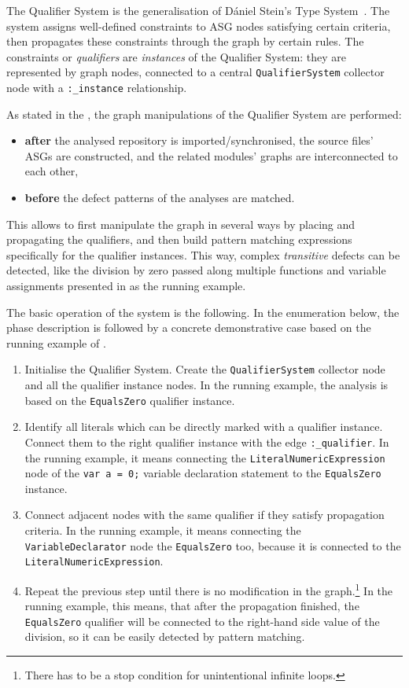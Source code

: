 The Qualifier System is the generalisation of Dániel Stein's Type System~\cite{stein-daniel-msc}. The system assigns well-defined constraints to ASG nodes satisfying certain criteria, then propagates these constraints through the graph by certain rules. The constraints or \emph{qualifiers} are \emph{instances} of the Qualifier System: they are represented by graph nodes, connected to a central \lstinline{QualifierSystem} collector node with a \lstinline{:_instance} relationship.

As stated in the , the graph manipulations of the Qualifier System are performed:
\begin{itemize}
\item \textbf{after} the analysed repository is imported/synchronised, the source files' ASGs are constructed, and the related modules' graphs are interconnected to each other,
\item \textbf{before} the defect patterns of the analyses are matched.
\end{itemize}

This allows to first manipulate the graph in several ways by placing and propagating the qualifiers, and then build pattern matching expressions specifically for the qualifier instances. This way, complex \emph{transitive} defects can be detected, like the division by zero passed along multiple functions and variable assignments presented in  as the running example.

The basic operation of the system is the following. In the enumeration below, the phase description is followed by a concrete demonstrative case based on the running example of .

\begin{enumerate}
\item Initialise the Qualifier System. Create the \lstinline{QualifierSystem} collector node and all the qualifier instance nodes. In the running example, the analysis is based on the \lstinline{EqualsZero} qualifier instance.
\item Identify all literals which can be directly marked with a qualifier instance. Connect them to the right qualifier instance with the edge \lstinline{:_qualifier}. In the running example, it means connecting the \lstinline{LiteralNumericExpression} node of the \lstinline{var a = 0;} variable declaration statement to the \lstinline{EqualsZero} instance.
\item Connect adjacent nodes with the same qualifier if they satisfy propagation criteria. In the running example, it means connecting the \lstinline{VariableDeclarator} node the \lstinline{EqualsZero} too, because it is connected to the \lstinline{LiteralNumericExpression}.
\item Repeat the previous step until there is no modification in the graph.\footnote{There has to be a stop condition for unintentional infinite loops.} In the running example, this means, that after the propagation finished, the \lstinline{EqualsZero} qualifier will be connected to the right-hand side value of the division, so it can be easily detected by pattern matching.
\end{enumerate}


